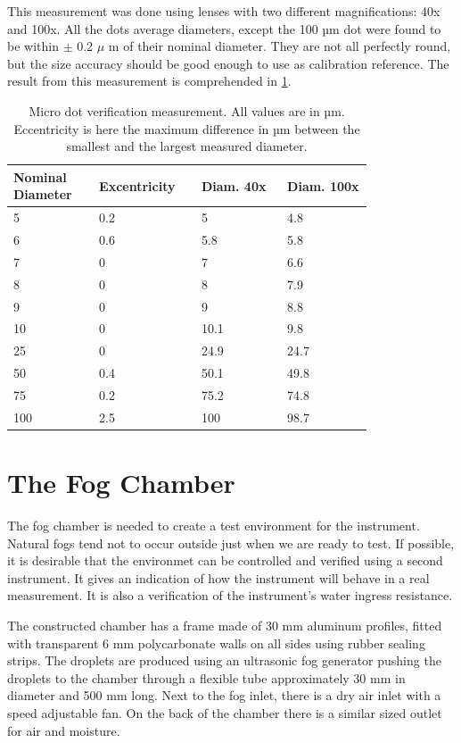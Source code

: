 This measurement was done using lenses with two different magnifications: 40x and 100x. All the dots average diameters, except the 100 µm dot were found to be within $\pm$ 0.2 $\mu$ m of their nominal diameter. They are not all perfectly round, but the size accuracy should be good enough to use as calibration reference. The result from this measurement is comprehended in \cref{tab:ref_meas}.

\begin{table}[ht]
\centering
\begin{tabular}{p{0.2\linewidth} p{0.2\linewidth} p{0.2\linewidth} p{0.2\linewidth}}
\hline
\textbf{Nominal Diameter} & \textbf{Excentricity} & \textbf{Diam. 40x} & \textbf{Diam. 100x} \\
\hline
5 & 0.2 & 5 & 4.8 \\
6 & 0.6 & 5.8 & 5.8 \\
7 & 0 & 7 & 6.6 \\
8 & 0 & 8 & 7.9 \\
9 & 0 & 9 & 8.8 \\
10 & 0 & 10.1 & 9.8 \\
25 & 0 & 24.9 & 24.7 \\
50 & 0.4 & 50.1 & 49.8 \\
75 & 0.2 & 75.2 & 74.8 \\
100 & 2.5 & 100 & 98.7 \\
\hline
\end{tabular}
\caption{Micro dot verification measurement. All values are in µm. Eccentricity is here the maximum difference in µm between the smallest and the largest measured diameter.}
\label{tab:ref_meas}
\end{table}



\section{The Fog Chamber}
The fog chamber is needed to create a test environment for the instrument. Natural fogs tend not to occur outside just when we are ready to test. If possible, it is desirable that the environmet can be controlled and verified using a second instrument. It gives an indication of how the instrument will behave in a real measurement. It is also a verification of the instrument’s water ingress resistance.

The constructed chamber has a frame made of 30 mm aluminum profiles, fitted with transparent 6 mm polycarbonate walls on all sides using rubber sealing strips. The droplets are produced using an ultrasonic fog generator pushing the droplets to the chamber through a flexible tube approximately 30 mm in diameter and 500 mm long. Next to the fog inlet, there is a dry air inlet with a speed adjustable fan. On the back of the chamber there is a similar sized outlet for air and moisture.
 
